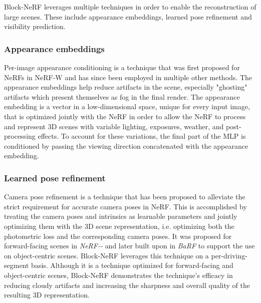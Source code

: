 Block-NeRF leverages multiple techniques in order to enable the reconstruction of large scenes. These include appearance embeddings, learned pose refinement and visibility prediction.

\subsubsection{Appearance embeddings} \label{sec:appearance-embeddings}
Per-image appearance conditioning is a technique that was first proposed for NeRFs in NeRF\nobreakdash-W \cite{martin-brualla_nerf_2021} and has since been employed in multiple other methods. The appearance embeddings help reduce artifacts in the scene, especially "ghosting" artifacts which present themselves as fog in the final render. The appearance embedding is a vector in a low-dimensional space, unique for every input image, that is optimized jointly with the NeRF in order to allow the NeRF to process and represent 3D scenes with variable lighting, exposures, weather, and post-processing effects. To account for these variations, the final part of the MLP is conditioned by passing the viewing direction concatenated with the appearance embedding.

\subsubsection{Learned pose refinement} \label{sec:camera-pose-refinement}
Camera pose refinement is a technique that has been proposed to alleviate the strict requirement for accurate camera poses in NeRF. This is accomplished by treating the camera poses and intrinsics as learnable parameters and jointly optimizing them with the 3D scene representation, i.e. optimizing both the photometric loss and the corresponding camera poses. It was proposed for forward-facing scenes in \textit{NeRF\nobreakdash-\nobreakdash-} \cite{wang_nerf--_2022} and later built upon in \textit{BaRF} \cite{lin_barf_2021} to support the use on object-centric scenes. Block-NeRF leverages this technique on a per-driving-segment basis. Although it is a technique optimized for forward-facing and object-centric scenes, Block-NeRF demonstrates the technique's efficacy in reducing cloudy artifacts and increasing the sharpness and overall quality of the resulting 3D representation.


